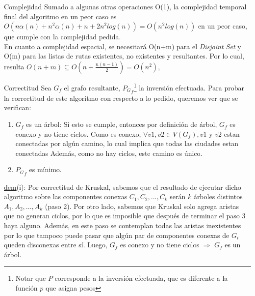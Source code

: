 \documentclass[a4paper]{article}
\begin{document}
\begin{subsection}{Complejidad}
Sumado a algunas otras operaciones O(1), la complejidad temporal final del algoritmo en un peor caso es $O(n\alpha(n)+n^2\alpha(n)+n+2n^2log(n)) = O(n^2log(n))$ en un peor caso, que cumple con la complejidad pedida. \\

En cuanto a complejidad espacial, se necesitar\'{a} O(n+m) para el \textit{Disjoint Set} y O(m) para las listas de rutas existentes, no existentes y resultantes. Por lo cual, resulta $O(n+m) \subseteq O(n+\frac{n(n-1)}{2}) = O(n^2)$, 
\end{subsection}

\begin{subsection}{Correctitud}
Sea $G_f$ el grafo resultante, ${P_G}_f$\footnote{Notar que $P$ corresponde a la inversi\'{o}n efectuada, que es diferente a la funci\'{o}n $p$ que asigna pesos} la inversi\'{o}n efectuada. Para probar la correctitud de este algoritmo con respecto a lo pedido, queremos ver que se verifican:
\begin{enumerate}[label=(\roman*)]
	\item{$G_f$ es un \'{a}rbol: Si esto se cumple, entonces por definici\'{o}n de \'{a}rbol,  $G_f$ es conexo y no tiene ciclos. Como es conexo, $\forall v1, v2 \in V(G_f), v1 $ y $ v2$ estan conectadas por alg\'{u}n camino, lo cual implica que todas las ciudades estan conectadas Adem\'{a}s, como no hay ciclos, este camino es \'{u}nico.}
    \item{${P_G}_f$ es m\'{i}nimo.}
\end{enumerate}

\underline{dem}(i): Por correctitud de Kruskal, sabemos que el resultado de ejecutar dicho algoritmo sobre las componentes conexas $C_1, C_2, ..., C_k$ ser\'{a}n $k$ \'{a}rboles distintos $A_1, A_2, ... , A_k$ (paso 2). Por otro lado, sabemos que Kruskal solo agrega aristas que no generan ciclos, por lo que es imposible que despu\'{e}s de terminar el paso 3 haya alguno. Adem\'{a}s, en este paso se contemplan todas las aristas inexistentes por lo que tampoco puede pasar que alg\'{u}n par de componentes conexas de $G_i$ queden disconexas entre s\'{i}. Luego, $G_f$ es conexo y no tiene ciclos $\Rightarrow$ $G_f$ es un \'{a}rbol.


\end{subsection}
\end{document}
